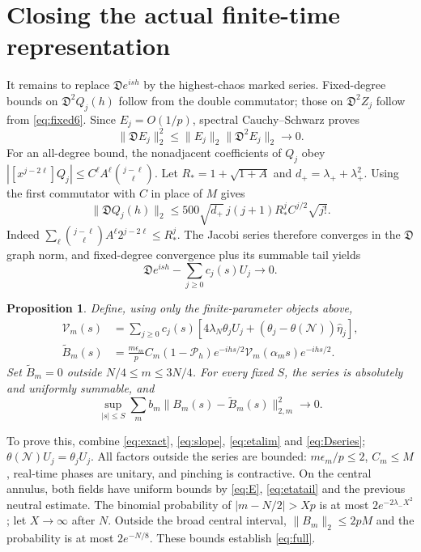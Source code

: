 \documentclass[11pt]{article}
\newcommand{\NN}{\mathcal N}
\newcommand{\DD}{\mathfrak D}
\newcommand{\PP}{\mathcal P_h}
\newcommand{\thN}{\theta(\NN)}
\newcommand{\ehat}{\widehat\eta}
\newtheorem{proposition}{Proposition}
\begin{document}
\newpage
\section{Closing the actual finite-time representation}\label{result}
It remains to replace $\DD e^{ish}$ by the highest-chaos marked series.
Fixed-degree bounds on $\DD^2Q_j(h)$ follow from the double commutator;
those on $\DD^2Z_j$ follow from \eqref{eq:fixed6}. Since $E_j=O(1/p)$,
spectral Cauchy--Schwarz proves
\begin{equation}
 \|\DD E_j\|_2^2\le\|E_j\|_2\|\DD^2E_j\|_2\longrightarrow0.
\end{equation}
For an all-degree bound, the nonadjacent coefficients of $Q_j$ obey
$|[x^{j-2\ell}]Q_j|\le C^\ell A^\ell\binom{j-\ell}{\ell}$.
Let $R_*=1+\sqrt{1+A}$ and $d_+=\lambda_++\lambda_+^2$.
Using the first commutator with $C$ in place of $M$ gives
\begin{equation}
 \|\DD Q_j(h)\|_2\le500\sqrt{d_+}\,j(j+1)R_*^j
                              C^{j/2}\sqrt{j!}.\label{eq:DQ}
\end{equation}
Indeed $\sum_\ell\binom{j-\ell}{\ell}A^\ell2^{j-2\ell}\le R_*^j$.
The Jacobi series therefore converges in the $\DD$ graph norm,
and fixed-degree convergence plus its summable tail yields
\begin{equation}
 \DD e^{ish}-\sum_{j\ge0}c_j(s)U_j\longrightarrow0.\label{eq:Dseries}
\end{equation}

\begin{proposition}
Define, using only the finite-parameter objects above,
\begin{align}
 \mathcal V_m(s)&=\sum_{j\ge0}c_j(s)
 \left[4\lambda_N\theta_jU_j+(\theta_j-\thN)\ehat_j\right],\label{eq:V}\\
 \widetilde B_m(s)&=\frac{m\epsilon_m}{p}C_m(1-\PP)
  e^{-ihs/2}\mathcal V_m(\alpha_ms)e^{-ihs/2}.\label{eq:Btilde}
\end{align}
Set $\widetilde B_m=0$ outside $N/4\le m\le3N/4$.
For every fixed $S$, the series is absolutely and uniformly summable,
and
\begin{equation}
 \sup_{|s|\le S}\sum_m b_m
          \|B_m(s)-\widetilde B_m(s)\|_{2,m}^2\longrightarrow0.\label{eq:full}
\end{equation}
\end{proposition}
To prove this, combine \eqref{eq:exact}, \eqref{eq:slope},
\eqref{eq:etalim} and \eqref{eq:Dseries}; $\thN U_j=\theta_jU_j$.
All factors outside the series are bounded: $m\epsilon_m/p\le2$,
$C_m\le M$, real-time phases are unitary, and pinching is contractive.
On the central annulus, both fields have uniform bounds by
\eqref{eq:E}, \eqref{eq:etatail} and the previous neutral estimate.
The binomial probability of $|m-N/2|>Xp$ is at most
$2e^{-2\lambda_-X^2}$; let $X\to\infty$ after $N$.
Outside the broad central interval, $\|B_m\|_2\le2pM$ and the
probability is at most $2e^{-N/8}$. These bounds establish \eqref{eq:full}.
\end{document}
